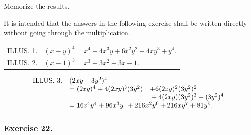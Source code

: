 \documentclass{book}
\begin{document}
Memorize the results.

It is intended that the answers in the following exercise
shall be written directly without going through the multiplication.

\begin{tabular}{cl}
ILLUS. 1. &$(x-y)^4=x^4-4x^3y+6x^2y^2-4xy^3+y^4$.\\
ILLUS. 2. &$(x-1)^3=x^3-3x^2+3x-1$.
\end{tabular}

\begin{displaymath}
\begin{array}{lll}
 \text{ILLUS. 3.} &\multicolumn{2}{l}{ (2xy+3y^2)^4 }  \\
\qquad & = (2xy)^4+4(2xy)^3(3y^2) &  + 6(2xy)^2(3y^2)^2   \\
       &                          &{}+ 4(2xy)(3y^2)^3+(3y^2)^4   \\
\qquad &\multicolumn{2}{l}{
         = 16x^4y^4+96x^3y^5+216x^2y^6+216xy^7+81y^8.}
\end{array}
\end{displaymath}


\subsubsection*{Exercise 22.}
\end{document}
